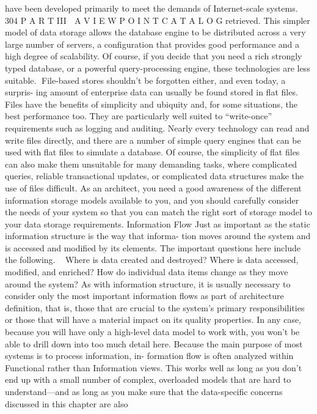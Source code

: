 have been developed primarily to meet the demands of Internet-scale systems.
304
 P A R T III  A V I E W P O I N T C A T A L O G
retrieved. This simpler model of data storage allows the database engine
to be distributed across a very large number of servers, a configuration
that provides good performance and a high degree of scalability. Of
course, if you decide that you need a rich strongly typed database, or a
powerful query-processing engine, these technologies are less suitable.
File-based stores shouldn’t be forgotten either, and even today, a surpris-
ing amount of enterprise data can usually be found stored in flat files.
Files have the benefits of simplicity and ubiquity and, for some situations,
the best performance too. They are particularly well suited to “write-once”
requirements such as logging and auditing. Nearly every technology can
read and write files directly, and there are a number of simple query
engines that can be used with flat files to simulate a database. Of course,
the simplicity of flat files can also make them unsuitable for many
demanding tasks, where complicated queries, reliable transactional
updates, or complicated data structures make the use of files difficult.
As an architect, you need a good awareness of the different information
storage models available to you, and you should carefully consider the needs
of your system so that you can match the right sort of storage model to your
data storage requirements.
Information Flow
Just as important as the static information structure is the way that informa-
tion moves around the system and is accessed and modified by its elements.
The important questions here include the following.
Where is data created and destroyed?
Where is data accessed, modified, and enriched?
How do individual data items change as they move around the system?
As with information structure, it is usually necessary to consider only the
most important information flows as part of architecture definition, that is,
those that are crucial to the system’s primary responsibilities or those that
will have a material impact on its quality properties. In any case, because you
will have only a high-level data model to work with, you won’t be able to drill
down into too much detail here.
Because the main purpose of most systems is to process information, in-
formation flow is often analyzed within Functional rather than Information
views. This works well as long as you don’t end up with a small number of
complex, overloaded models that are hard to understand—and as long as you
make sure that the data-specific concerns discussed in this chapter are also
